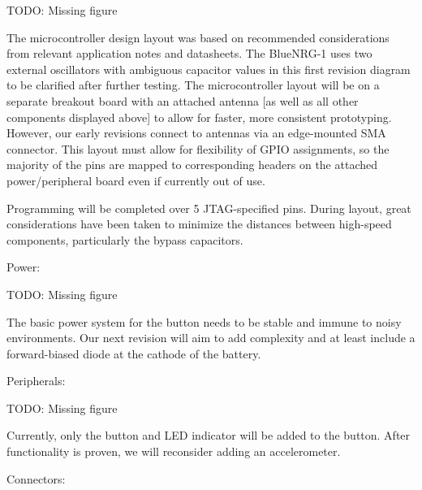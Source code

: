 \documentclass[journal]{IEEEtran}
\begin{document}
TODO: Missing figure

The microcontroller design layout was based on recommended considerations from relevant application notes and datasheets.  The BlueNRG-1 uses two external oscillators with ambiguous capacitor values in this first revision diagram to be clarified after further testing.  The microcontroller layout will be on a separate breakout board with an attached antenna [as well as all other components displayed above] to allow for faster, more consistent prototyping.  However, our early revisions connect to antennas via an edge-mounted SMA connector.  This layout must allow for flexibility of GPIO assignments, so the majority of the pins are mapped to corresponding headers on the attached power/peripheral board even if currently out of use.

Programming will be completed over 5 JTAG-specified pins.  During layout, great considerations have been taken to minimize the distances between high-speed components, particularly the bypass capacitors.

Power:

TODO: Missing figure

The basic power system for the button needs to be stable and immune to noisy environments.  Our next revision will aim to add complexity and at least include a forward-biased diode at the cathode of the battery.

Peripherals:

TODO: Missing figure

Currently, only the button and LED indicator will be added to the button.  After functionality is proven, we will reconsider adding an accelerometer.

Connectors:
\end{document}
